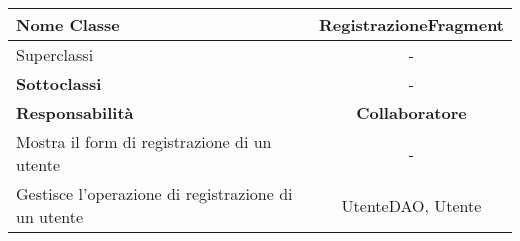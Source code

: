 
\setcounter{table}{0}
\begin{table}[H]
    \centering
    \begin{tabular}{||   l  ||  c   ||}
        \hline
        \rowcolor{Gray}
        \textbf{Nome Classe} & RegistrazioneFragment\\
        \hline
        Superclassi  &  - \\
        \hline
        \textbf{Sottoclassi} & - \\
        \hline
        \hline
         \textbf{Responsabilità} & \textbf{Collaboratore} \\
         \hline
          Mostra il form di registrazione di un utente & - \\
         \hline
          Gestisce l'operazione di registrazione di un utente & UtenteDAO, Utente \\
         \hline
    \end{tabular}
\end{table}

